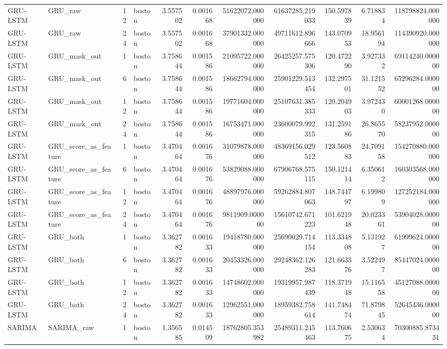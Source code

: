 \begin{longtable}{llrlrrrrrrr}
GRU-LSTM & GRU\_raw & 12 & boston & 3.557502 & 0.001668 & 51622072.000000 & 61637285.219033 & 150.597839 & 6.718834 & 118798824.000000 \\
GRU-LSTM & GRU\_raw & 24 & boston & 3.557502 & 0.001668 & 37901332.000000 & 49711612.896666 & 143.070953 & 18.956194 & 114390920.000000 \\
GRU-LSTM & GRU\_mask\_out & 1 & boston & 3.758644 & 0.001586 & 21095722.000000 & 26425257.575306 & 120.472290 & 3.927332 & 69114240.000000 \\
GRU-LSTM & GRU\_mask\_out & 6 & boston & 3.758644 & 0.001586 & 18662794.000000 & 25901229.513454 & 132.297501 & 31.121552 & 65296284.000000 \\
GRU-LSTM & GRU\_mask\_out & 12 & boston & 3.758644 & 0.001586 & 19771604.000000 & 25107631.385333 & 120.204903 & 3.972430 & 60001268.000000 \\
GRU-LSTM & GRU\_mask\_out & 24 & boston & 3.758644 & 0.001586 & 16753471.000000 & 23600079.992315 & 131.259186 & 26.865570 & 58237952.000000 \\
GRU-LSTM & GRU\_score\_as\_feature & 1 & boston & 3.470464 & 0.001676 & 31079878.000000 & 48369156.029512 & 123.560883 & 24.709158 & 154270880.000000 \\
GRU-LSTM & GRU\_score\_as\_feature & 6 & boston & 3.470464 & 0.001676 & 53829088.000000 & 67906768.575115 & 150.121414 & 6.350612 & 160303568.000000 \\
GRU-LSTM & GRU\_score\_as\_feature & 12 & boston & 3.470464 & 0.001676 & 48897976.000000 & 59262884.807063 & 148.744797 & 6.199809 & 127252184.000000 \\
GRU-LSTM & GRU\_score\_as\_feature & 24 & boston & 3.470464 & 0.001676 & 9811909.000000 & 15610742.671223 & 101.621948 & 20.023361 & 53904028.000000 \\
GRU-LSTM & GRU\_both & 1 & boston & 3.362782 & 0.001633 & 19418780.000000 & 25690029.714154 & 113.334808 & 5.131927 & 61999624.000000 \\
GRU-LSTM & GRU\_both & 6 & boston & 3.362782 & 0.001633 & 20453326.000000 & 29248362.126283 & 121.663376 & 3.522497 & 85447024.000000 \\
GRU-LSTM & GRU\_both & 12 & boston & 3.362782 & 0.001633 & 14748602.000000 & 19319957.987439 & 118.371948 & 15.116558 & 45127088.000000 \\
GRU-LSTM & GRU\_both & 24 & boston & 3.362782 & 0.001633 & 12962551.000000 & 18959382.758614 & 141.748474 & 71.879845 & 52645436.000000 \\
SARIMA & SARIMA\_raw & 1 & boston & 1.356585 & 0.014509 & 18762805.353982 & 25489311.245463 & 113.760675 & 2.530634 & 70300885.873431 \\

\end{longtable}
